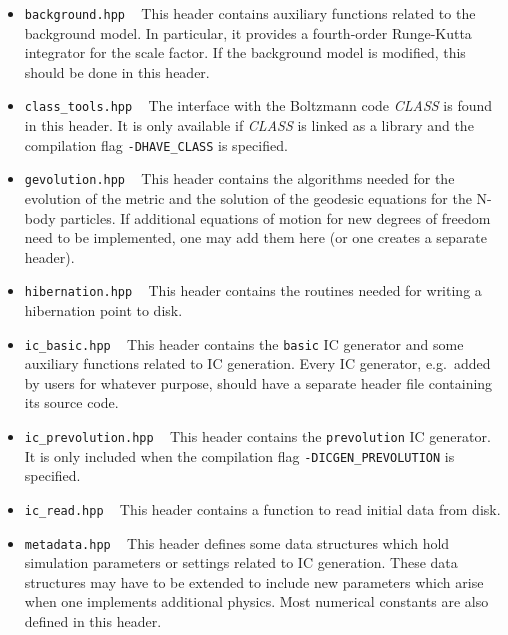 \documentclass[a4paper,10pt]{article}
\begin{document}
\begin{itemize}
 \item[] \hspace{-25pt}\texttt{background.hpp} ~ This header contains auxiliary functions related to the background model. In particular, it
 provides a fourth-order Runge-Kutta integrator for the scale factor. If the background model is modified, this should be done in this
 header.
 
 \item[] \hspace{-25pt}\texttt{class\_tools.hpp} ~ The interface with the Boltzmann code \textit{CLASS} is found in this header. It is only
 available if \textit{CLASS} is linked as a library and the compilation flag \texttt{-DHAVE\_CLASS} is specified.
 
 \item[] \hspace{-25pt}\texttt{gevolution.hpp} ~ This header contains the algorithms needed for the evolution of the metric and the solution
 of the geodesic equations for the N-body particles. If additional equations of motion for new degrees of freedom need to be implemented,
 one may add them here (or one creates a separate header).
 
 \item[] \hspace{-25pt}\texttt{hibernation.hpp} ~ This header contains the routines needed for writing a hibernation point to disk.
 
 \item[] \hspace{-25pt}\texttt{ic\_basic.hpp} ~ This header contains the \texttt{basic} IC generator and some auxiliary functions related to
 IC generation. Every IC generator, e.g.\ added by users for whatever purpose, should have a separate header file containing its source
 code.
 
 \item[] \hspace{-25pt}\texttt{ic\_prevolution.hpp} ~ This header contains the \texttt{prevolution} IC generator. It is only included when
 the compilation flag \texttt{-DICGEN\_PREVOLUTION} is specified.
 
 \item[] \hspace{-25pt}\texttt{ic\_read.hpp} ~ This header contains a function to read initial data from disk.
 
 \item[] \hspace{-25pt}\texttt{metadata.hpp} ~ This header defines some data structures which hold simulation parameters or settings related
 to IC generation. These data structures may have to be extended to include new parameters which arise when one implements additional
 physics. Most numerical constants are also defined in this header.
 

\end{itemize}
\end{document}
